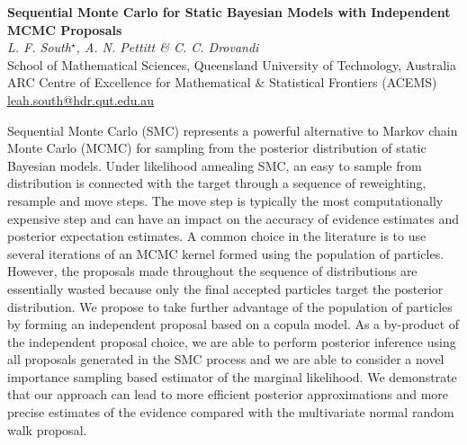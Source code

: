 \documentclass[12pt]{article}
\newcommand{\postertitle}[1]{{\Large\bf #1}\\[12pt]}
\newcommand{\authors}[1]{\emph{#1}\\}
\newcommand{\affiliations}[1]{{#1}\\}
\newcommand{\contacts}[1]{{#1}}
\begin{document}
\begin{center}
\vspace*{0.5cm}
%
\postertitle{Sequential Monte Carlo for Static Bayesian Models with Independent MCMC Proposals}
%
\authors{L. F. South$^\star$, A. N. Pettitt \& C. C. Drovandi} %
% 
\affiliations{School of Mathematical Sciences, Queensland University of Technology, Australia\\ ARC Centre of Excellence for Mathematical \& Statistical Frontiers (ACEMS)}
%
\contacts{\url{leah.south@hdr.qut.edu.au}} %
%
\vspace*{0.3cm}
\end{center}

Sequential Monte Carlo (SMC) represents a powerful alternative to Markov chain Monte Carlo (MCMC) for sampling from the posterior distribution of static Bayesian models. Under likelihood annealing SMC, an easy to sample from distribution is connected with the target through a sequence of reweighting, resample and move steps. The move step is typically the most computationally expensive step and can have an impact on the accuracy of evidence estimates and posterior expectation estimates. A common choice in the literature is to use several iterations of an MCMC kernel formed using the population of particles. However, the proposals made throughout the sequence of distributions are essentially wasted because only the final accepted particles target the posterior distribution. We propose to take further advantage of the population of particles by forming an independent proposal based on a copula model. As a by-product of the independent proposal choice, we are able to perform posterior inference using all proposals generated in the SMC process and we are able to consider a novel importance sampling based estimator of the marginal likelihood. We demonstrate that our approach can lead to more efficient posterior approximations and more precise estimates of the evidence compared with the multivariate normal random walk proposal.
\end{document}
